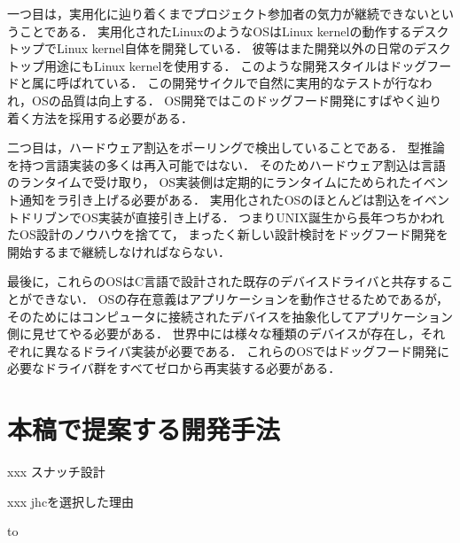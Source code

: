 \documentclass[submit,techreq,noauthor]{ipsj}
\begin{document}
一つ目は，実用化に辿り着くまでプロジェクト参加者の気力が継続できないということである．
実用化されたLinuxのようなOSはLinux kernelの動作するデスクトップでLinux kernel自体を開発している．
彼等はまた開発以外の日常のデスクトップ用途にもLinux kernelを使用する．
このような開発スタイルはドッグフードと属に呼ばれている．
この開発サイクルで自然に実用的なテストが行なわれ，OSの品質は向上する．
OS開発ではこのドッグフード開発にすばやく辿り着く方法を採用する必要がある．

二つ目は，ハードウェア割込をポーリングで検出していることである．
型推論を持つ言語実装の多くは再入可能ではない．
そのためハードウェア割込は言語のランタイムで受け取り，
OS実装側は定期的にランタイムにためられたイベント通知をラ引き上げる必要がある．
実用化されたOSのほとんどは割込をイベントドリブンでOS実装が直接引き上げる．
つまりUNIX誕生から長年つちかわれたOS設計のノウハウを捨てて，
まったく新しい設計検討をドッグフード開発を開始するまで継続しなければならない．

最後に，これらのOSはC言語で設計された既存のデバイスドライバと共存することができない．
OSの存在意義はアプリケーションを動作させるためであるが，
そのためにはコンピュータに接続されたデバイスを抽象化してアプリケーション側に見せてやる必要がある．
世界中には様々な種類のデバイスが存在し，それぞれに異なるドライバ実装が必要である．
これらのOSではドッグフード開発に必要なドライバ群をすべてゼロから再実装する必要がある．

\section{本稿で提案する開発手法}

xxx スナッチ設計

xxx jhcを選択した理由

\begin{table}[tb]
\caption{``hoge''と印字するプログラムに見るコンパイラの特性}
\label{tab:compilerlist}
\hbox to
\end{table}
\end{document}
